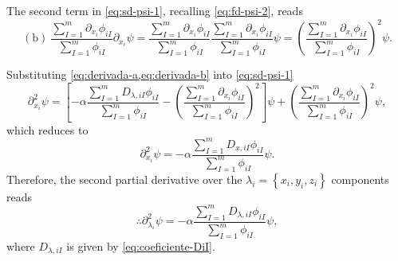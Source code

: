The second term in \cref{eq:sd-psi-1}, recalling \cref{eq:fd-psi-2}, reads
\begin{equation} \label{eq:derivada-b}
    \left( \mathrm{b} \right)\
    \frac{
        \sum_{I=1}^{m} \partial_{x_i} \phi_{iI}
    }{
        \sum_{I=1}^{m} \phi_{iI}
    }
    \partial_{x_i}
    \psi
    =
    \frac{
        \sum_{I=1}^{m} \partial_{x_i} \phi_{iI}
    }{
        \sum_{I=1}^{m} \phi_{iI}
    }
    \frac{
        \sum_{I=1}^{m} \partial_{x_i} \phi_{iI}
    }{
        \sum_{I=1}^{m} \phi_{iI}
    }
    \psi
    =
    \left( 
        \frac{
            \sum_{I=1}^{m} \partial_{x_i} \phi_{iI}
        }{
            \sum_{I=1}^{m} \phi_{iI}
        }
    \right)^{2}
    \psi
    .
\end{equation}

Substituting \cref{eq:derivada-a,eq:derivada-b} into \cref{eq:sd-psi-1}
\begin{equation}
    \partial_{x_i}^{2} \psi =
    \left[ 
        -\alpha
        \frac{
            \sum_{I=1}^{m}
            D_{\lambda,iI}
            \phi_{iI}
        }{
            \sum_{I=1}^{m} \phi_{iI}
        }
        -
        \left( 
            \frac{
                \sum_{I=1}^{m}
                \partial_{x_i}
                \phi_{iI}
            }{
                \sum_{I=1}^{m} \phi_{iI}
            }
        \right)^{2}
    \right]
    \psi
    +
    \left( 
        \frac{
            \sum_{I=1}^{m} \partial_{x_i} \phi_{iI}
        }{
            \sum_{I=1}^{m} \phi_{iI}
        }
    \right)^{2}
    \psi
    ,
\end{equation}
which reduces to
\begin{equation}
    \partial_{x_i}^{2} \psi =
    -\alpha
    \frac{
        \sum_{I=1}^{m}
        D_{x,iI}
        \phi_{iI}
    }{
        \sum_{I=1}^{m} \phi_{iI}
    }
    \psi
    .
\end{equation}
Therefore, the second partial derivative over the 
$\lambda_i = \left\{ x_i, y_i, z_i \right\}$
components reads
\begin{equation} \label{eq:derivada-psi2-lambda}
    \therefore
    \partial_{\lambda_i}^{2} \psi =
    -\alpha
    \frac{
        \sum_{I=1}^{m}
            D_{\lambda,iI}
        \phi_{iI}
    }{
        \sum_{I=1}^{m} \phi_{iI}
    }
    \psi
    ,
\end{equation}
where $D_{\lambda,iI}$ is given by \cref{eq:coeficiente-DiI}.

